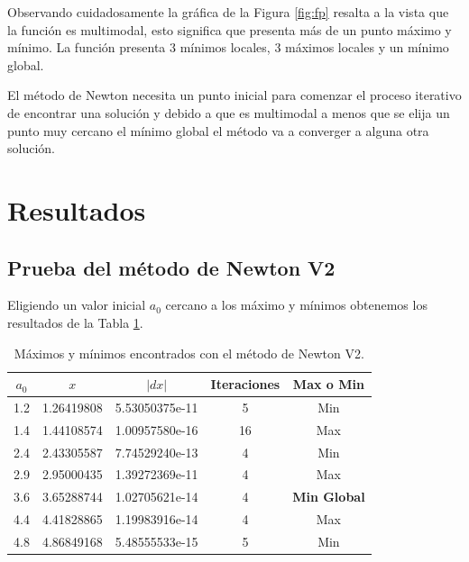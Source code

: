 \documentclass[conference]{IEEEtran}
\begin{document}
Observando cuidadosamente la gráfica de la Figura \ref{fig:fp} resalta a la vista que la función es multimodal, esto significa que presenta más de un punto máximo y mínimo. La función presenta 3 mínimos locales, 3 máximos locales y un mínimo global. 

El método de Newton necesita un punto inicial para comenzar el proceso iterativo de encontrar una solución y debido a que es multimodal a menos que se elija un punto muy cercano el mínimo global el método va a converger a alguna otra solución.

\section{Resultados}

\subsection{Prueba del método de Newton V2}
Eligiendo un valor inicial $a_{0}$ cercano a los máximo y mínimos obtenemos los resultados de la Tabla \ref{tab:res1}.

	\begin{table}[h!]   
	\caption{Máximos y mínimos encontrados con el método de Newton V2.}                                                                                                                
		\centering                                       
		\begin{tabular}{ccccc}
			\hline                                             
			$a_{0}$ & $x$  & $|dx|$ & Iteraciones & Max o Min\\                     
			\hline 
			1.2 & 1.26419808  & 5.53050375e-11 & 5 & Min\\                                            
			1.4 & 1.44108574  & 1.00957580e-16  & 16 & Max\\                                            
			2.4 & 2.43305587  & 7.74529240e-13 & 4 & Min\\                                            
			2.9 & 2.95000435  & 1.39272369e-11 & 4 & Max\\                                            
			3.6 & 3.65288744  & 1.02705621e-14 & 4 &\textbf{Min Global}\\                                            
			4.4 & 4.41828865  & 1.19983916e-14 & 4 & Max\\                                            
			4.8 & 4.86849168  & 5.48555533e-15 & 5 & Min\\                                            
			\hline                                             
		\end{tabular}
		\label{tab:res1}
	\end{table}	
\end{document}
